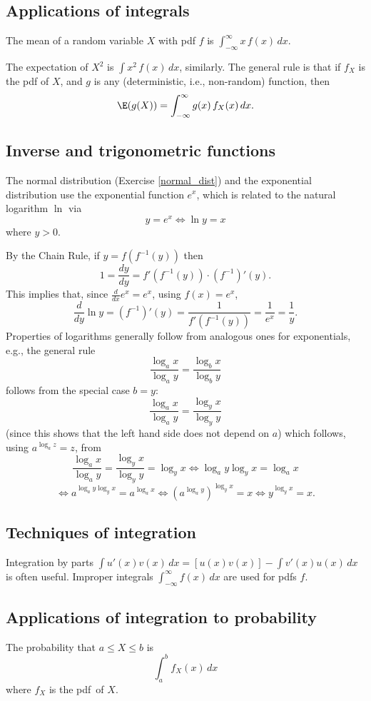 \subsection{Applications of integrals}%

	The mean of a random variable $X$ with pdf $f$ is $\int_{-\infty}^\infty x\,f(x)\,dx$.

	The expectation of $X^2$ is $\int x^2\,f(x)\,dx$, similarly.
	The general rule is that if $f_X$ is the pdf of $X$, and $g$ is any (deterministic, i.e., non-random) function, then
	\[
		\E(g(X)) = \int_{-\infty}^\infty g(x)\,f_X(x)\,dx.
	\]
\subsection{Inverse and trigonometric functions}%

	The normal distribution (Exercise \ref{normal_dist}) and the exponential distribution use the exponential function $e^x$,
	which is related to the natural logarithm $\ln$ via
	\[
		y=e^x\iff \ln y=x
	\]
	where $y>0$.

	By the Chain Rule, if $y=f(f^{-1}(y))$ then
	\[
		1 = \frac{dy}{dy} = f'(f^{-1}(y))\cdot (f^{-1})'(y).
	\]
	This implies that, since $\frac{d}{dx} e^x=e^x$, using $f(x)=e^x$,
	\[
		\frac{d}{dy}\ln y = (f^{-1})'(y)=\frac1{f'(f^{-1}(y))} = \frac1{e^x} = \frac1y.
	\]
	Properties of logarithms generally follow from analogous ones for exponentials, e.g., the general rule
	\[
		\frac{\log_a x}{\log_a y} = \frac{\log_b x}{\log_b y}
	\]
	follows from the special case $b=y$:
	\[
		\frac{\log_a x}{\log_a y} = \frac{\log_y x}{\log_y y}
	\]
	(since this shows that the left hand side does not depend on $a$)
	which follows, using $a^{\log_a z}=z$, from
	\[
		\frac{\log_a x}{\log_a y} = \frac{\log_y x}{\log_y y}=\log_y x\iff \log_a y\log_y x = \log_a x
	\]
	\[
		\iff a^{\log_a y\log_y x} = a^{\log_a x}
		\iff (a^{\log_a y})^{\log_y x}=x
		\iff y^{\log_y x}=x.
	\]

\subsection{Techniques of integration}

Integration by parts $\int u'(x)v(x)\,dx=[u(x)v(x)]-\int v'(x)u(x)\,dx$ is often useful. %
Improper integrals $\int_{-\infty}^\infty f(x)\,dx$ are used for pdfs $f$.

\subsection{Applications of integration to probability}
The probability that $a\le X\le b$ is
\[
	\int_a^b f_X(x)\,dx
\]
where $f_X$ is the pdf~of $X$.

